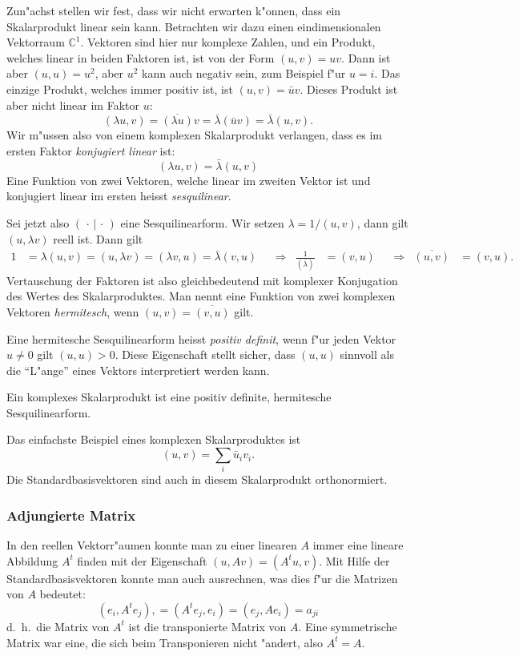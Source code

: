 Zun"achst stellen wir fest, dass wir nicht erwarten k"onnen, dass
ein Skalarprodukt linear sein kann.
Betrachten wir dazu einen eindimensionalen Vektorraum $\mathbb C^1$.
Vektoren sind hier nur komplexe Zahlen, und ein Produkt, welches
linear in beiden Faktoren ist, ist von der Form $(u,v)=uv$. Dann ist
aber $(u,u)=u^2$, aber $u^2$ kann auch negativ sein, zum Beispiel f"ur $u=i$.
Das einzige Produkt, welches immer positiv ist, ist $(u,v)=\bar uv$.
Dieses Produkt ist aber nicht linear im Faktor $u$:
\[
(\lambda u,v)=\overline{(\lambda u)}v=\bar\lambda (\bar uv)=\bar\lambda (u,v).
\]
Wir m"ussen also von einem komplexen Skalarprodukt verlangen, dass es
im ersten Faktor {\em konjugiert linear} ist:
\[
(\lambda u,v)=\bar\lambda(u,v)
\]
Eine Funktion von zwei Vektoren, welche linear im zweiten Vektor ist
und konjugiert linear im ersten heisst {\em sesquilinear}.
%
%

Sei jetzt also $(\,\cdot\,|\,\cdot\,)$ eine Sesquilinearform.
Wir setzen $\lambda = 1/(u,v)$, dann gilt
$(u,\lambda v)$ reell ist. Dann gilt
\begin{align*}
1&=\lambda (u,v)=(u,\lambda v)=(\lambda v,u)=\bar\lambda(v,u)
&
&\Rightarrow&
\frac1{(\bar\lambda)}&=(v,u)
&
&\Rightarrow&
\overline{(u,v)}&=(v,u).
\end{align*}
Vertauschung der Faktoren ist also gleichbedeutend mit komplexer Konjugation
des Wertes des Skalarproduktes. Man nennt eine Funktion von zwei komplexen
Vektoren {\em hermitesch}, wenn $(u,v)=\overline{(v,u)}$ gilt.

Eine hermitesche Sesquilinearform heisst {\em positiv definit}, wenn
f"ur jeden Vektor $u\ne 0$ gilt $(u,u)>0$. Diese Eigenschaft stellt
sicher, dass $(u,u)$ sinnvoll als die ``L"ange'' eines Vektors interpretiert
werden kann.

\begin{definition}
Ein komplexes Skalarprodukt ist eine positiv definite,
hermitesche Sesquilinearform.
\end{definition}

Das einfachste Beispiel eines komplexen Skalarproduktes ist
\[
(u,v)=\sum_i \bar u_iv_i.
\]
Die Standardbasisvektoren sind auch in diesem Skalarprodukt
orthonormiert.

%
%
\subsubsection{Adjungierte Matrix}
In den reellen Vektorr"aumen konnte man zu einer linearen $A$ immer
eine lineare Abbildung $A^t$ finden mit der Eigenschaft
$(u,Av)=(A^tu,v)$. Mit Hilfe der Standardbasisvektoren konnte
man auch ausrechnen, was dies f"ur die Matrizen von $A$ bedeutet:
\[
(e_i,A^te_j),
=
(A^te_j, e_i)
=
(e_j,Ae_i)=a_{ji}
\]
d.~h.~die Matrix von $A^t$ ist die transponierte Matrix von $A$.
Eine symmetrische Matrix war eine, die sich beim Transponieren nicht
"andert, also $A^t=A$.

